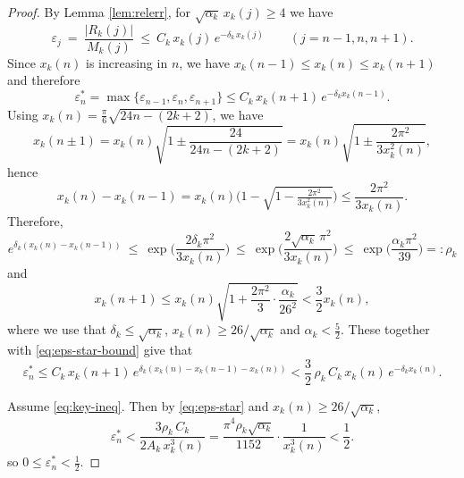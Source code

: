 \documentclass[12pt]{article}
\numberwithin{equation}{section}
\begin{document}
\begin{proof}
By Lemma \ref{lem:relerr}, for $\sqrt{\alpha_k}\,x_k(j)\ge 4$ we have
\begin{equation*}
\varepsilon_j\ =\ \frac{|R_k(j)|}{M_k(j)}\ \le\ C_k\,x_k(j)\,e^{-\delta_k\,x_k(j)}\qquad(j=n-1,n,n+1).
\end{equation*}
Since $x_k(n)$ is increasing in $n$, we have $x_k(n-1)\le x_k(n)\le x_k(n+1)$ and therefore
\begin{equation}\label{eq:eps-star-bound}
\varepsilon_n^\ast=\max\{\varepsilon_{n-1},\varepsilon_n,\varepsilon_{n+1}\}
\le C_k\, x_k(n+1)\, e^{-\delta_k x_k(n-1)}.
\end{equation}
Using $x_k(n)=\frac{\pi}{6}\sqrt{24n-(2k+2)}$, we have
\[
x_k(n\pm1)=x_k(n)\sqrt{1\pm\frac{24}{24n-(2k+2)}}=x_k(n)\sqrt{1\pm\frac{2\pi^2}
{3x_k^2(n)}},
\]
hence
\[
x_k(n)-x_k(n-1)=x_k(n)\Big(1-\sqrt{1-\tfrac{2\pi^2}{3x_k^2(n)}}\Big)\le \frac{2\pi^2}{3x_k(n)}.
\]
Therefore,
\[
e^{\delta_k(x_k(n)-x_k(n-1))}\ \le\ \exp\!\Big(\frac{2\delta_k\pi^2}{3x_k(n)}\Big)
\ \le\ \exp\!\Big(\frac{2\sqrt{\alpha_k}\,\pi^2}{3x_k(n)}\Big)
\ \le\ \exp\!\Big(\frac{\alpha_k\pi^2}{39}\Big)=:\rho_k
\]
and
\[x_k(n+1)\le x_k(n)\sqrt{1+\frac{2\pi^2}
{3}\cdot \frac{\alpha_k}{26^2}}< \frac{3}{2}x_k(n), \]
where we use that $\delta_k\le \sqrt{\alpha_k}$, $x_k(n)\ge 26/\sqrt{\alpha_k}$ and $\alpha_k<\frac{5}{2}$. These together with \eqref{eq:eps-star-bound} give that
\begin{equation}\label{eq:eps-star}
\varepsilon_n^\ast\le C_k\, x_k(n+1)\, e^{\delta_k (x_k(n)-x_k(n-1)-x_k(n))} < \frac{3}{2}\,\rho_k\,C_k\, x_k(n)\, e^{-\delta_k x_k(n)}.
\end{equation}

Assume \eqref{eq:key-ineq}. Then by \eqref{eq:eps-star} and $x_k(n)\ge 26/\sqrt{\alpha_k}$,
\[
\varepsilon_n^\ast < \frac{3\rho_k\,C_k}{2A_k\,x_k^3(n)}
=\frac{\pi^4\rho_k\sqrt{\alpha_k}}{1152}\cdot\frac{1}{x_k^3(n)}< \frac12.
\]
so \(0\le\varepsilon_n^\ast<\tfrac12\).


\end{proof}
\end{document}
